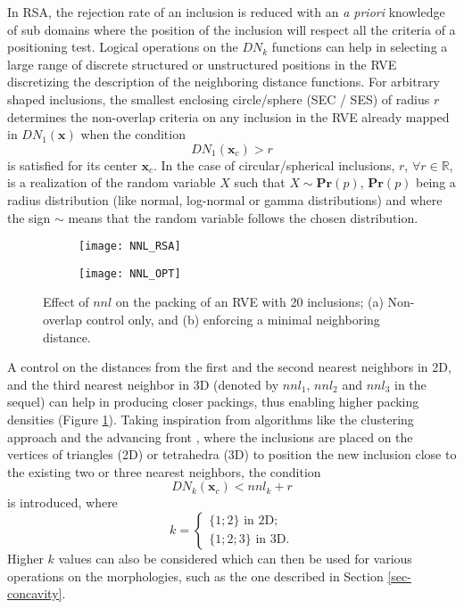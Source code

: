 In RSA, the rejection rate of an inclusion is reduced with an \textit{a priori} knowledge of sub domains where the position of the inclusion will respect all the criteria of a positioning  test. Logical operations on the $ DN_k $ functions can help in selecting a large range of discrete structured or unstructured positions in the RVE discretizing the description of the neighboring distance functions. For arbitrary shaped inclusions, the smallest enclosing circle/sphere (SEC / SES) of radius $ r $ determines the non-overlap criteria on any inclusion in the RVE already mapped in $ DN_1(\textbf{x}) $ when the condition  
\begin{equation}
 DN_1(\textbf{x}_c)>r \label{secses1}
\end{equation}
is satisfied for its center $ \textbf{x}_c $. In the case of circular/spherical inclusions, $r$, $  \forall r \in \mathbb{R} $, is a realization of the random variable $ \textit{X} $ such that $X\sim\textbf{Pr}(p)$, $\textbf{Pr}(p)$ being a radius distribution (like normal, log-normal or gamma distributions) and where the sign $ \sim $ means that the random variable follows the chosen distribution.

\begin{figure}
	\centering
	\begin{subfigure}[t]{0.3375\textwidth}
		\texttt{[image: NNL\_RSA]}	
		\caption{}
	\end{subfigure}
	\begin{subfigure}[t]{0.3375\textwidth}
		\texttt{[image: NNL\_OPT]}	
		\caption{}
	\end{subfigure}
	\caption{Effect of $nnl$ on the packing of an RVE with 20 inclusions; (a) Non-overlap control only, and (b) enforcing a minimal neighboring distance.}\label{nnl}
\end{figure}

A control on the distances from the first and the second nearest neighbors in 2D, and the third nearest neighbor in 3D (denoted by $ nnl_1 $, $ nnl_2 $ and $ nnl_3 $ in the sequel) can help in producing closer packings, thus enabling higher packing densities (Figure \ref{nnl}). Taking inspiration from algorithms like the clustering approach \cite{kimEffectRearrangementSimulated2002} and the advancing front \cite{bagiAlgorithmGenerateRandom2005}, where the inclusions are placed on the vertices of triangles (2D) or tetrahedra (3D) to position the new inclusion  close to the existing two or three nearest neighbors, the condition
\begin{equation}
DN_k(\textbf{x}_c)<nnl_k+r\label{secses2}
\end{equation} is introduced, where\[ k = \begin{cases}
\{1;2\} \text{ in 2D};
\\\{1;2;3\}\text{ in 3D}.
\end{cases} \]
Higher $ k $ values can also be considered which can then be used for various operations on the morphologies, such as the one described in Section \ref{sec-concavity}.

